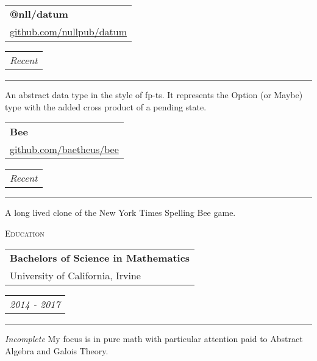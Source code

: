 \documentclass{article}
\makeatletter
\newcommand{\split}[3]{
\noindent\begin{tabular}[t]{@{}l}
    \textbf{#1} \\ #2
\end{tabular}
\hfill
\begin{tabular}[t]{l@{}}
    \\
    \textit{#3}
\end{tabular}
\noindent\rule{\columnwidth}{0.5pt}
}
\newcommand{\sub}[1]{
    {\raggedleft
        \large{\textsc{\color{OliveGreen}#1}}\par
    }
}
\makeatother
\begin{document}
\begin{multicols}{2}
\split{@nll/datum}{\href{https://github.com/nullpub/datum}{github.com/nullpub/datum}}{Recent}
An abstract data type in the style of fp-ts. It represents the Option (or
Maybe) type with the added cross product of a pending state.

\split{Bee}{\href{https://github.com/baetheus/bee}{github.com/baetheus/bee}}{Recent}
A long lived clone of the New York Times Spelling Bee game.

\sub{Education} \split{Bachelors of Science in Mathematics}{University of
California, Irvine}{2014 - 2017} \textit{Incomplete} My focus is in pure
math with particular attention paid to Abstract Algebra and Galois Theory.

\end{multicols}
\end{document}
